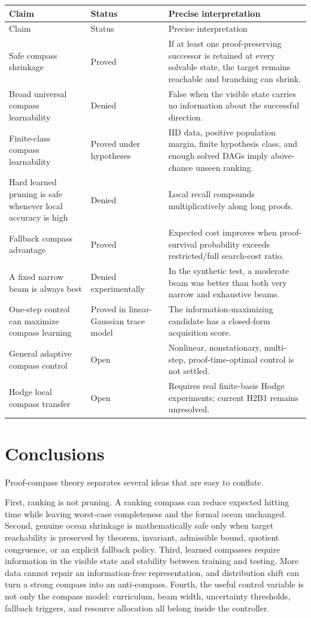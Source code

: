 \documentclass[11pt]{article}
\begin{document}
\begin{longtable}{p{}p{}p{}}
\toprule
Claim & Status & Precise interpretation\\
\midrule
\endfirsthead
\toprule
Claim & Status & Precise interpretation\\
\midrule
\endhead
Safe compass shrinkage & Proved & If at least one proof-preserving successor is retained at every solvable state, the target remains reachable and branching can shrink.\\
Broad universal compass learnability & Denied & False when the visible state carries no information about the successful direction.\\
Finite-class compass learnability & Proved under hypotheses & IID data, positive population margin, finite hypothesis class, and enough solved DAGs imply above-chance unseen ranking.\\
Hard learned pruning is safe whenever local accuracy is high & Denied & Local recall compounds multiplicatively along long proofs.\\
Fallback compass advantage & Proved & Expected cost improves when proof-survival probability exceeds restricted/full search-cost ratio.\\
A fixed narrow beam is always best & Denied experimentally & In the synthetic test, a moderate beam was better than both very narrow and exhaustive beams.\\
One-step control can maximize compass learning & Proved in linear-Gaussian trace model & The information-maximizing candidate has a closed-form acquisition score.\\
General adaptive compass control & Open & Nonlinear, nonstationary, multi-step, proof-time-optimal control is not settled.\\
Hodge local compass transfer & Open & Requires real finite-basis Hodge experiments; current H2B1 remains unresolved.\\
\bottomrule
\end{longtable}

\section{Conclusions}

Proof-compass theory separates several ideas that are easy to conflate.

First, ranking is not pruning. A ranking compass can reduce expected hitting time while leaving worst-case completeness and the formal ocean unchanged. Second, genuine ocean shrinkage is mathematically safe only when target reachability is preserved by theorem, invariant, admissible bound, quotient congruence, or an explicit fallback policy. Third, learned compasses require information in the visible state and stability between training and testing. More data cannot repair an information-free representation, and distribution shift can turn a strong compass into an anti-compass. Fourth, the useful control variable is not only the compass model: curriculum, beam width, uncertainty thresholds, fallback triggers, and resource allocation all belong inside the controller.
\end{document}

